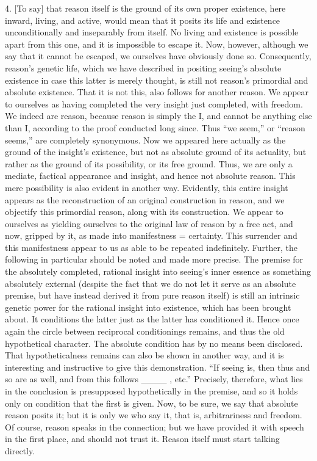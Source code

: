 4. [To say] that reason itself is
the ground of its own proper existence,
here inward, living, and active,
would mean that it posits its life and existence
unconditionally and inseparably from itself.
No living and existence is possible apart from this one,
and it is impossible to escape it.
Now, however, although we say that it cannot be escaped,
we ourselves have obviously done so.
Consequently, reason’s genetic life,
which we have described in
positing seeing’s absolute existence
in case this latter is merely thought,
is still not reason’s primordial
and absolute existence.
That it is not this,
also follows for another reason.
We appear to ourselves as having completed the very insight
just completed, with freedom.
We indeed are reason,
because reason is simply the I,
and cannot be anything else than I,
according to the proof conducted long since.
Thus “we seem,” or “reason seems,”
are completely synonymous.
Now we appeared here actually as
the ground of the insight’s existence,
but not as absolute ground of its actuality,
but rather as the ground of its possibility,
or its free ground.
Thus, we are only a mediate, factical appearance and insight,
and hence not absolute reason.
This mere possibility is
also evident in another way.
Evidently, this entire insight appears as
the reconstruction of an original construction in reason,
and we objectify this primordial reason,
along with its construction.
We appear to ourselves as yielding ourselves
to the original law of reason by a free act,
and now, gripped by it, as made into manifestness = certainty.
This surrender and this manifestness appear to us
as able to be repeated indefinitely.
Further, the following in particular
should be noted and made more precise.
The premise for the absolutely completed,
rational insight into seeing’s inner essence
as something absolutely external
(despite the fact that we do not
let it serve as an absolute premise,
but have instead derived it from pure reason itself)
is still an intrinsic genetic power
for the rational insight into existence,
which has been brought about.
It conditions the latter just as
the latter has conditioned it.
Hence once again the circle
between reciprocal conditionings remains,
and thus the old hypothetical character.
The absolute condition has by no means been disclosed.
That hypotheticalness remains can also be shown in another way,
and it is interesting and instructive to give this demonstration.
“If seeing is, then thus and so are as well,
and from this follows ____ , etc.”
Precisely, therefore, what lies in the conclusion is
presupposed hypothetically in the premise,
and so it holds only on condition that the first is given.
Now, to be sure, we say that absolute reason posits it;
but it is only we who say it, that is, arbitrariness and freedom.
Of course, reason speaks in the connection;
but we have provided it with speech in the first place,
and should not trust it.
Reason itself must start talking directly.

